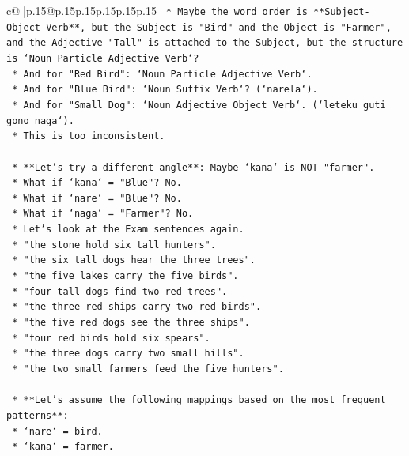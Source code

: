\documentclass{article}
\begin{document}
{\begin{supertabular}{c@{$\;$}|p{.15\linewidth}@{}p{.15\linewidth}p{.15\linewidth}p{.15\linewidth}p{.15\linewidth}p{.15\linewidth}}
{{{\texttt{                *   Maybe the word order is **Subject{-}Object{-}Verb**, but the Subject is "Bird" and the Object is "Farmer", and the Adjective "Tall" is attached to the Subject, but the structure is `Noun Particle Adjective Verb`?} \\
\texttt{                *   And for "Red Bird": `Noun Particle Adjective Verb`.} \\
\texttt{                *   And for "Blue Bird": `Noun Suffix Verb`? (`narela`).} \\
\texttt{                *   And for "Small Dog": `Noun Adjective Object Verb`. (`leteku guti gono naga`).} \\
\texttt{                *   This is too inconsistent.} \\
\\ 
\texttt{    *   **Let's try a different angle**: Maybe `kana` is NOT "farmer".} \\
\texttt{        *   What if `kana` = "Blue"? No.} \\
\texttt{        *   What if `nare` = "Blue"? No.} \\
\texttt{        *   What if `naga` = "Farmer"? No.} \\
\texttt{        *   Let's look at the Exam sentences again.} \\
\texttt{        *   "the stone hold six tall hunters".} \\
\texttt{        *   "the six tall dogs hear the three trees".} \\
\texttt{        *   "the five lakes carry the five birds".} \\
\texttt{        *   "four tall dogs find two red trees".} \\
\texttt{        *   "the three red ships carry two red birds".} \\
\texttt{        *   "the five red dogs see the three ships".} \\
\texttt{        *   "four red birds hold six spears".} \\
\texttt{        *   "the three dogs carry two small hills".} \\
\texttt{        *   "the two small farmers feed the five hunters".} \\
\\ 
\texttt{    *   **Let's assume the following mappings based on the most frequent patterns**:} \\
\texttt{        *   `nare` = bird.} \\
\texttt{        *   `kana` = farmer.} \\
}}}
\end{supertabular}}
\end{document}
